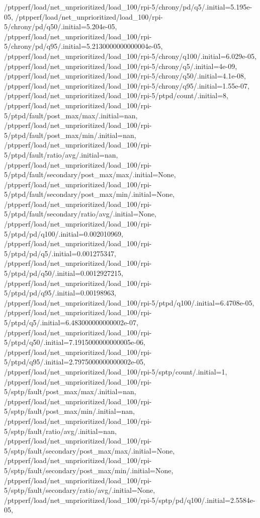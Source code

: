 {    /ptpperf/load/net_unprioritized/load_100/rpi-5/chrony/pd/q5/.initial=5.195e-05,
    /ptpperf/load/net_unprioritized/load_100/rpi-5/chrony/pd/q50/.initial=5.204e-05,
    /ptpperf/load/net_unprioritized/load_100/rpi-5/chrony/pd/q95/.initial=5.2130000000000004e-05,
    /ptpperf/load/net_unprioritized/load_100/rpi-5/chrony/q100/.initial=6.029e-05,
    /ptpperf/load/net_unprioritized/load_100/rpi-5/chrony/q5/.initial=4e-09,
    /ptpperf/load/net_unprioritized/load_100/rpi-5/chrony/q50/.initial=4.1e-08,
    /ptpperf/load/net_unprioritized/load_100/rpi-5/chrony/q95/.initial=1.55e-07,
    /ptpperf/load/net_unprioritized/load_100/rpi-5/ptpd/count/.initial=8,
    /ptpperf/load/net_unprioritized/load_100/rpi-5/ptpd/fault/post_max/max/.initial=nan,
    /ptpperf/load/net_unprioritized/load_100/rpi-5/ptpd/fault/post_max/min/.initial=nan,
    /ptpperf/load/net_unprioritized/load_100/rpi-5/ptpd/fault/ratio/avg/.initial=nan,
    /ptpperf/load/net_unprioritized/load_100/rpi-5/ptpd/fault/secondary/post_max/max/.initial=None,
    /ptpperf/load/net_unprioritized/load_100/rpi-5/ptpd/fault/secondary/post_max/min/.initial=None,
    /ptpperf/load/net_unprioritized/load_100/rpi-5/ptpd/fault/secondary/ratio/avg/.initial=None,
    /ptpperf/load/net_unprioritized/load_100/rpi-5/ptpd/pd/q100/.initial=0.002010969,
    /ptpperf/load/net_unprioritized/load_100/rpi-5/ptpd/pd/q5/.initial=0.001275347,
    /ptpperf/load/net_unprioritized/load_100/rpi-5/ptpd/pd/q50/.initial=0.0012927215,
    /ptpperf/load/net_unprioritized/load_100/rpi-5/ptpd/pd/q95/.initial=0.00198963,
    /ptpperf/load/net_unprioritized/load_100/rpi-5/ptpd/q100/.initial=6.4708e-05,
    /ptpperf/load/net_unprioritized/load_100/rpi-5/ptpd/q5/.initial=6.483000000000002e-07,
    /ptpperf/load/net_unprioritized/load_100/rpi-5/ptpd/q50/.initial=7.1915000000000005e-06,
    /ptpperf/load/net_unprioritized/load_100/rpi-5/ptpd/q95/.initial=2.7975000000000002e-05,
    /ptpperf/load/net_unprioritized/load_100/rpi-5/sptp/count/.initial=1,
    /ptpperf/load/net_unprioritized/load_100/rpi-5/sptp/fault/post_max/max/.initial=nan,
    /ptpperf/load/net_unprioritized/load_100/rpi-5/sptp/fault/post_max/min/.initial=nan,
    /ptpperf/load/net_unprioritized/load_100/rpi-5/sptp/fault/ratio/avg/.initial=nan,
    /ptpperf/load/net_unprioritized/load_100/rpi-5/sptp/fault/secondary/post_max/max/.initial=None,
    /ptpperf/load/net_unprioritized/load_100/rpi-5/sptp/fault/secondary/post_max/min/.initial=None,
    /ptpperf/load/net_unprioritized/load_100/rpi-5/sptp/fault/secondary/ratio/avg/.initial=None,
    /ptpperf/load/net_unprioritized/load_100/rpi-5/sptp/pd/q100/.initial=2.5584e-05,
}
